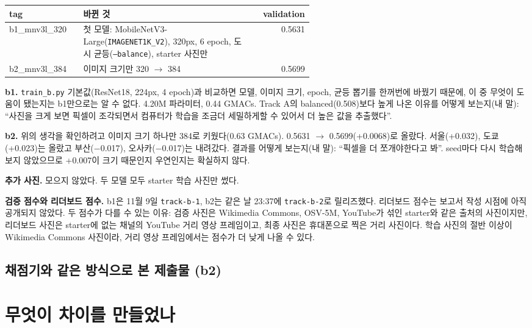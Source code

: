 \documentclass[11pt]{article}
\begin{document}
\begin{center}\footnotesize
\begin{tabular}{lp{0.58\linewidth}r}
\toprule
tag & 바뀐 것 & validation \\
\midrule
b1\_mnv3l\_320 & 첫 모델: MobileNetV3-Large(\texttt{IMAGENET1K\_V2}), 320px, 6 epoch, 도시 균등(\texttt{--balance}), starter 사진만 & 0.5631 \\
b2\_mnv3l\_384 & 이미지 크기만 320 $\to$ 384 & 0.5699 \\
\bottomrule
\end{tabular}
\end{center}

\textbf{b1.} \texttt{train\_b.py} 기본값(ResNet18, 224px, 4 epoch)과 비교하면 모델, 이미지 크기, epoch, 균등 뽑기를 한꺼번에 바꿨기 때문에,
이 중 무엇이 도움이 됐는지는 b1만으로는 알 수 없다. 4.20M 파라미터, 0.44 GMACs.
Track A의 balanced(0.508)보다 높게 나온 이유를 어떻게 보는지(내 말):
``사진을 크게 보면 픽셀이 조각되면서 컴퓨터가 학습을 조금더 세밀하게할 수 있어서 더 높은 값을 추출했다''.

\textbf{b2.} 위의 생각을 확인하려고 이미지 크기 하나만 384로 키웠다(0.63 GMACs). 0.5631 $\to$ 0.5699(+0.0068)로 올랐다.
서울(+0.032), 도쿄(+0.023)는 올랐고 부산($-$0.017), 오사카($-$0.017)는 내려갔다. 결과를 어떻게 보는지(내 말): ``픽셀을 더 쪼개야한다고 봐''.
seed마다 다시 학습해 보지 않았으므로 +0.007이 크기 때문인지 우연인지는 확실하지 않다.

\textbf{추가 사진.} 모으지 않았다. 두 모델 모두 starter 학습 사진만 썼다.

\textbf{검증 점수와 리더보드 점수.} b1은 11월 9일 \texttt{track-b-1}, b2는 같은 날 23:37에 \texttt{track-b-2}로 릴리즈했다.
리더보드 점수는 보고서 작성 시점에 아직 공개되지 않았다. 두 점수가 다를 수 있는 이유: 검증 사진은 Wikimedia Commons, OSV-5M, YouTube가 섞인
starter와 같은 출처의 사진이지만, 리더보드 사진은 starter에 없는 채널의 YouTube 거리 영상 프레임이고, 최종 사진은 휴대폰으로 찍은 거리 사진이다.
학습 사진의 절반 이상이 Wikimedia Commons 사진이라, 거리 영상 프레임에서는 점수가 더 낮게 나올 수 있다.

\subsection*{채점기와 같은 방식으로 본 제출물 (b2)}

\section*{무엇이 차이를 만들었나}
\end{document}
